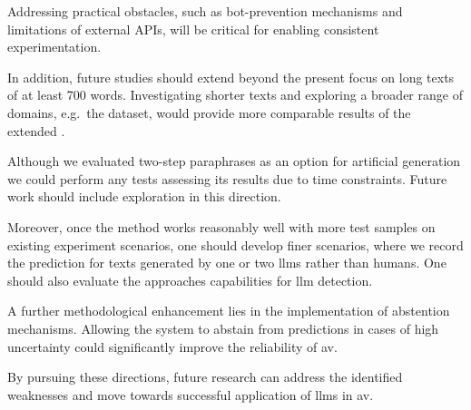 Addressing practical obstacles, such as bot-prevention mechanisms and limitations of external APIs, will be critical for enabling consistent experimentation. 

In addition, future studies should extend beyond the present focus on long texts of at least 700 words. 
Investigating shorter texts and exploring a broader range of domains, e.g.\ the \dataPan{} dataset, would provide more comparable results of the extended \impAppr{}.

Although we evaluated two-step paraphrases as an option for artificial \imp{} generation we could perform any tests assessing its \impAppr{} results due to time constraints.
Future work should include exploration in this direction.

Moreover, once the method works reasonably well with more test samples on existing experiment scenarios, one should develop finer scenarios, where we record the prediction for texts generated by one or two \acp{llm} rather than humans.
One should also evaluate the approaches capabilities for \ac{llm} detection.

A further methodological enhancement lies in the implementation of abstention mechanisms. 
Allowing the system to abstain from predictions in cases of high uncertainty could significantly improve the reliability of \ac{av}. 

By pursuing these directions, future research can address the identified weaknesses and move towards successful application of \acp{llm} in \ac{av}.
